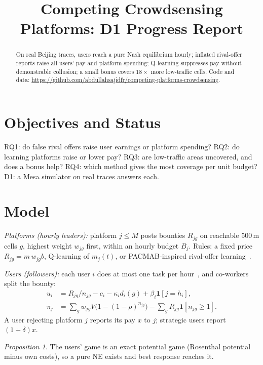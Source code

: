 \documentclass[conference,9pt]{IEEEtran}
\begin{document}
\title{Competing Crowdsensing Platforms: D1 Progress Report}
\author{
}
\maketitle

\begin{abstract}
On real Beijing traces, users reach a pure Nash equilibrium hourly; inflated rival-offer reports raise all users' pay and platform spending; Q-learning suppresses pay without demonstrable collusion; a small bonus covers $18\times$ more low-traffic cells. Code and data: \url{https://github.com/abdullahsajidfr/competing-platforms-crowdsensing}.
\end{abstract}

\section{Objectives and Status}
RQ1: do false rival offers raise user earnings or platform spending? RQ2: do learning platforms raise or lower pay? RQ3: are low-traffic areas uncovered, and does a bonus help? RQ4: which method gives the most coverage per unit budget? D1: a Mesa simulator on real traces answers each.

\section{Model}
\emph{Platforms (hourly leaders):} platform $j\!\le\!M$ posts bounties $R_{jg}$ on reachable 500\,m cells $g$, highest weight $w_{jg}$ first, within an hourly budget $B_j$. Rules: a fixed price $R_{jg}{=}m\,w_{jg}b$, Q-learning of $m_j(t)$, or PACMAB-inspired rival-offer learning~\cite{dongare}.

\emph{Users (followers):} each user $i$ does at most one task per hour~\cite{dongare}, and co-workers split the bounty:
\begin{align*}
u_i&=R_{jg}/n_{jg}-c_i-\kappa_i d_i(g)+\beta_i\mathbf 1[j{=}h_i],\\
\pi_j&=\textstyle\sum_g w_{jg}V\big(1-(1-\rho)^{n_{jg}}\big)-\sum_g R_{jg}\mathbf 1[n_{jg}{\ge}1].
\end{align*}
A user rejecting platform $j$ reports its pay $x$ to $j$; strategic users report $(1{+}\delta)x$.

\emph{Proposition 1.} The users' game is an exact potential game (Rosenthal potential minus own costs), so a pure NE exists and best response reaches it.
\end{document}

